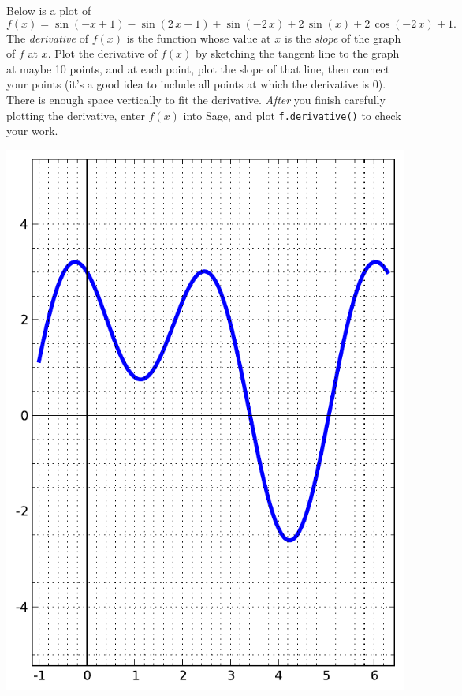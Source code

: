 Below is a plot of $$f(x)=\sin\left(-x + 1\right) - \sin\left(2 \, x + 1\right) + \sin\left(-2 \, x\right) + 2 \, \sin\left(x\right) + 2 \, \cos\left(-2 \, x\right) + 1.$$  The {\em \color{red}derivative} of $f(x)$ is the function whose value at $x$ is the {\em slope} of the graph of $f$ at $x$.  Plot the derivative of $f(x)$ by sketching the tangent line to the graph at maybe 10 points, and at each point, plot the slope of that line, then connect your points (it's a good idea to include all points at which the derivative is 0).  There is enough space vertically to fit the derivative.  {\em After} you finish carefully plotting the derivative, enter $f(x)$ into Sage, and plot {\color{blue}\verb|f.derivative()|} to check your work.
\begin{center}\includegraphics{functions/44.pdf}\end{center}\newpage

